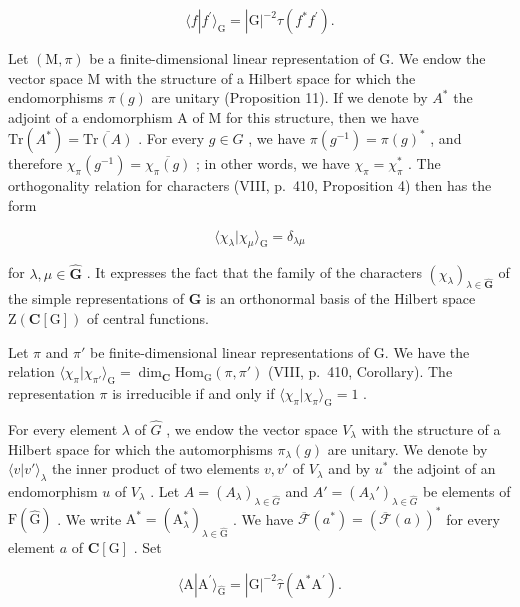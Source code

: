 \[
\langle f | f ^ {\prime} \rangle_ {\mathrm{G}} = | \mathrm{G} | ^ {- 2} \tau (f ^ {*} f ^ {\prime}).\tag{53}
\]

Let \((\mathrm{M},\pi)\) be a finite-dimensional linear representation of G. We endow the vector space M with the structure of a Hilbert space for which the endomorphisms \(\pi(g)\) are unitary (Proposition 11). If we denote by \(A^{*}\) the adjoint of a endomorphism A of M for this structure, then we have \(\mathrm{Tr}(A^{*})=\overline{\mathrm{Tr}(A)}\) . For every \(g\in G\) , we have \(\pi(g^{-1})=\pi(g)^{*}\) , and therefore \(\chi_{\pi}(g^{-1})=\overline{\chi_{\pi}(g)}\) ; in other words, we have \(\chi_{\pi}=\chi_{\pi}^{*}\) . The orthogonality relation for characters (VIII, p.~410, Proposition 4) then has the form

\[
\langle \chi_ {\lambda} | \chi_ {\mu} \rangle_ {\mathrm{G}} = \delta_ {\lambda \mu}\tag{54}
\]

for \(\lambda, \mu \in \widehat{\mathbf{G}}\) . It expresses the fact that the family of the characters \((\chi_{\lambda})_{\lambda \in \widehat{\mathbf{G}}}\) of the simple representations of \(\mathbf{G}\) is an orthonormal basis of the Hilbert space \(\mathrm{Z}(\mathbf{C}[\mathrm{G}])\) of central functions.

Let \(\pi\) and \(\pi'\) be finite-dimensional linear representations of G. We have the relation \(\langle \chi_{\pi}|\chi_{\pi'}\rangle_{\mathrm{G}} = \dim_{\mathbf{C}}\mathrm{Hom}_{\mathrm{G}}(\pi, \pi')\) (VIII, p.~410, Corollary). The representation \(\pi\) is irreducible if and only if \(\langle \chi_{\pi}|\chi_{\pi}\rangle_{\mathrm{G}} = 1\) .

For every element \(\lambda\) of \(\widehat{G}\) , we endow the vector space \(V_{\lambda}\) with the structure of a Hilbert space for which the automorphisms \(\pi_{\lambda}(g)\) are unitary. We denote by \(\langle v|v'\rangle_{\lambda}\) the inner product of two elements \(v, v'\) of \(V_{\lambda}\) and by \(u^{*}\) the adjoint of an endomorphism \(u\) of \(V_{\lambda}\) . Let \(A = (A_{\lambda})_{\lambda \in \widehat{G}}\) and \(A' = (A_{\lambda}')_{\lambda \in \widehat{G}}\) be elements of \(\mathrm{F}(\widehat{\mathrm{G}})\) . We write \(\mathrm{A}^* = (\mathrm{A}_\lambda^*)_{\lambda \in \widehat{\mathrm{G}}}\) . We have \(\overline{\mathcal{F}} (a^{*}) = (\overline{\mathcal{F}} (a))^*\) for every element \(a\) of \(\mathbf{C}[\mathrm{G}]\) . Set

\[
\langle \mathrm{A} | \mathrm{A} ^ {\prime} \rangle_ {\widehat {\mathrm{G}}} = | \mathrm{G} | ^ {- 2} \widehat {\tau} (\mathrm{A} ^ {*} \mathrm{A} ^ {\prime}).\tag{55}
\]

